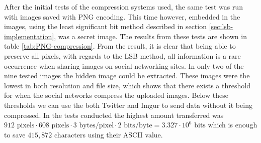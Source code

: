 After the initial tests of the compression systems used, the same test was run with images saved with PNG encoding.
This time however, embedded in the images, using the least significant bit method described in section \ref{sec:lsb-implementation}, was a secret image. 
The results from these tests are shown in table \ref{tab:PNG-compression}.
From the result, it is clear that being able to preserve all pixels, with regards to the LSB method, all information is a rare occurrence when sharing images on social networking sites. In only two of the nine tested images the hidden image could be extracted. 
These images were the lowest in both resolution and file size, which shows that there exists a threshold for when the social networks compress the uploaded images. 
Below these thresholds we can use the both Twitter and Imgur to send data without it being compressed. In the tests conducted the highest amount transferred was $912\text{ pixels} \cdot 608\text{ pixels} \cdot 3\text{ bytes/pixel} \cdot 2\text{ bits/byte} = 3.327\cdot 10^6\text{ bits}$ which is enough to save $415,872$ characters using their ASCII value.\\ 


